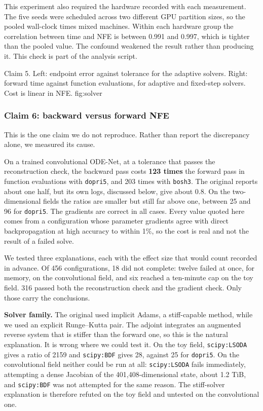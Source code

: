 This experiment also required the hardware recorded with each measurement. The five seeds were
scheduled across two different GPU partition sizes, so the pooled wall-clock times mixed
machines. Within each hardware group the correlation between time and NFE is between 0.991 and
0.997, which is tighter than the pooled value. The confound weakened the result rather than
producing it. This check is part of the analysis script.

  {Claim 5. Left: endpoint error against tolerance for the adaptive solvers. Right: forward
   time against function evaluations, for adaptive and fixed-step solvers. Cost is linear in
   NFE.}
  {fig:solver}

\subsubsection{Claim 6: backward versus forward NFE}
\label{sec:claim6}

This is the one claim we do not reproduce. Rather than report the discrepancy alone, we
measured its cause.

On a trained convolutional ODE-Net, at a tolerance that passes the reconstruction check, the
backward pass costs \textbf{123 times} the forward pass in function evaluations with
\texttt{dopri5}, and 203 times with \texttt{bosh3}. The original reports about one half, but its own logs, discussed below, give about 0.8. On
the two-dimensional fields the ratios are smaller but still far above one, between 25 and 96
for \texttt{dopri5}. The gradients are correct in all cases. Every value quoted here comes
from a configuration whose parameter gradients agree with direct backpropagation at high
accuracy to within 1\%, so the cost is real and not the result of a failed solve.

We tested three explanations, each with the effect size that would count recorded in advance.
Of 456 configurations, 18 did not
complete: twelve failed at once, for memory, on the convolutional field, and six reached a
ten-minute cap on the toy field. 316 passed both the reconstruction check and the gradient
check. Only those carry the conclusions.

\textbf{Solver family.} The original used implicit Adams, a stiff-capable method, while we
used an explicit Runge--Kutta pair. The adjoint integrates an augmented reverse system that is
stiffer than the forward one, so this is the natural explanation. It is wrong where we could test it. On the toy field, \texttt{scipy:LSODA} gives a ratio of
2159 and \texttt{scipy:BDF} gives 28, against 25 for \texttt{dopri5}. On the convolutional field
neither could be run at all: \texttt{scipy:LSODA} fails immediately, attempting a dense Jacobian
of the 401{,}408-dimensional state, about 1.2 TiB, and \texttt{scipy:BDF} was not attempted for
the same reason. The stiff-solver explanation is therefore refuted on the toy field and untested
on the convolutional one.

